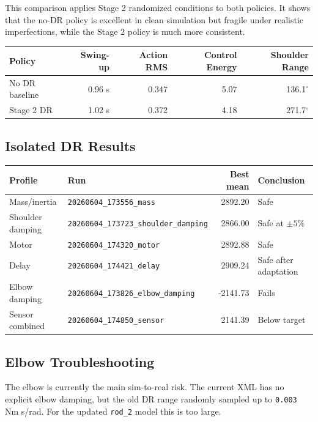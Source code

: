 \documentclass[12pt,a4paper]{article}
\begin{document}
\noindent This comparison applies Stage 2 randomized conditions to both
policies.  It shows that the no-DR policy is excellent in clean simulation but
fragile under realistic imperfections, while the Stage 2 policy is much more
consistent.

\begin{center}
\begin{tabular}{lrrrr}
\toprule
\textbf{Policy} & \textbf{Swing-up} & \textbf{Action RMS} & \textbf{Control Energy} & \textbf{Shoulder Range} \\
\midrule
No DR baseline & 0.96 s & 0.347 & 5.07 & 136.1$^\circ$ \\
Stage 2 DR & 1.02 s & 0.372 & 4.18 & 271.7$^\circ$ \\
\bottomrule
\end{tabular}
\end{center}

\subsection{Isolated DR Results}

\begin{center}
\begin{tabular}{llrl}
\toprule
\textbf{Profile} & \textbf{Run} & \textbf{Best mean} & \textbf{Conclusion} \\
\midrule
Mass/inertia & \texttt{20260604\_173556\_mass} & 2892.20 & Safe \\
Shoulder damping & \texttt{20260604\_173723\_shoulder\_damping} & 2866.00 & Safe at $\pm5\%$ \\
Motor & \texttt{20260604\_174320\_motor} & 2892.88 & Safe \\
Delay & \texttt{20260604\_174421\_delay} & 2909.24 & Safe after adaptation \\
Elbow damping & \texttt{20260604\_173826\_elbow\_damping} & -2141.73 & Fails \\
Sensor combined & \texttt{20260604\_174850\_sensor} & 2141.39 & Below target \\
\bottomrule
\end{tabular}
\end{center}

\subsection{Elbow Troubleshooting}

The elbow is currently the main sim-to-real risk.  The current XML has no
explicit elbow damping, but the old DR range randomly sampled up to
\texttt{0.003} Nm s/rad.  For the updated \texttt{rod\_2} model this is too
large.
\end{document}
